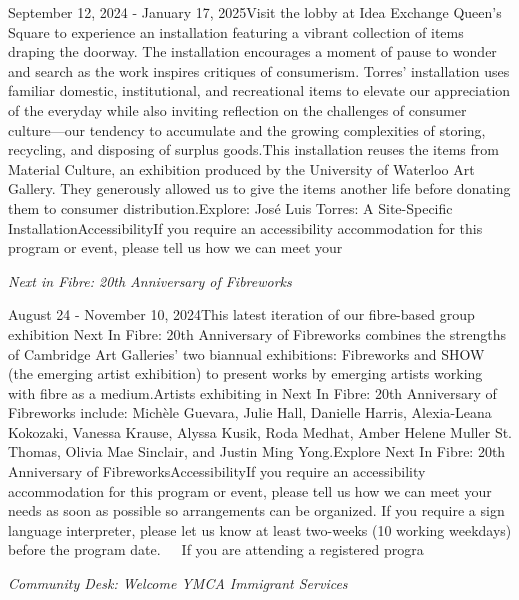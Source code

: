 \documentclass[letterpaper, 10pt]{article}
\newcommand{\subtitle}[1]{\textit{\large #1}\vspace{0.5em}}
\newcommand{\articlecontent}[1]{\small #1\vspace{1em}}
\begin{document}
\begin{multicols}{2}
{September 12, 2024 - January 17, 2025Visit the lobby at Idea Exchange Queen's Square to experience an installation featuring a vibrant collection of items draping the doorway. The installation encourages a moment of pause to wonder and search as the work inspires critiques of consumerism. Torres’ installation uses familiar domestic, institutional, and recreational items to elevate our appreciation of the everyday while also inviting reflection on the challenges of consumer culture—our tendency to accumulate and the growing complexities of storing, recycling, and disposing of surplus goods.This installation reuses the items from Material Culture, an exhibition produced by the University of Waterloo Art Gallery. They generously allowed us to give the items another life before donating them to consumer distribution.Explore: José Luis Torres: A Site-Specific InstallationAccessibilityIf you require an accessibility accommodation for this program or event, please tell us how we can meet your
}
\vspace{10px}

\subtitle{Next in Fibre: 20th Anniversary of Fibreworks}

\articlecontent{

\qrcode[height=1.5cm]{https://ideaexchange.libnet.info/event/11807114}
\vspace{10px}

August 24 - November 10, 2024This latest iteration of our fibre-based group exhibition Next In Fibre: 20th Anniversary of Fibreworks combines the strengths of Cambridge Art Galleries’ two biannual exhibitions: Fibreworks and SHOW (the emerging artist exhibition) to present works by emerging artists working with fibre as a medium.Artists exhibiting in Next In Fibre: 20th Anniversary of Fibreworks include: Michèle Guevara, Julie Hall, Danielle Harris, Alexia-Leana Kokozaki, Vanessa Krause, Alyssa Kusik, Roda Medhat, Amber Helene Muller St. Thomas, Olivia Mae Sinclair, and Justin Ming Yong.Explore Next In Fibre: 20th Anniversary of FibreworksAccessibilityIf you require an accessibility accommodation for this program or event, please tell us how we can meet your needs as soon as possible so arrangements can be organized. If you require a sign language interpreter, please let us know at least two-weeks (10 working weekdays) before the program date.   If you are attending a registered progra
}
\vspace{10px}

\subtitle{Community Desk: Welcome YMCA Immigrant Services}


\end{multicols}
\end{document}

